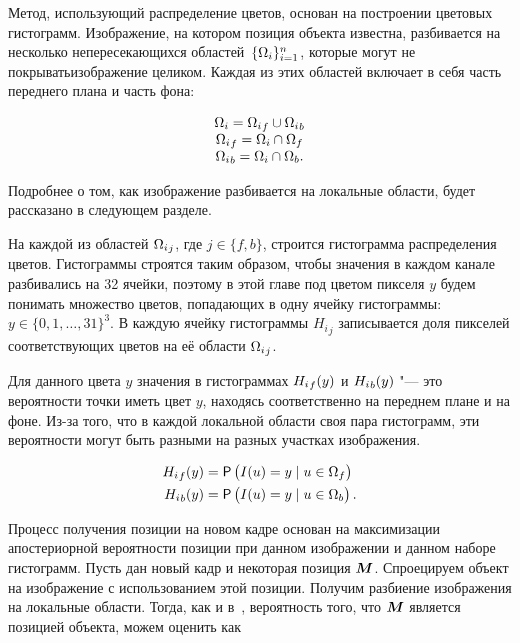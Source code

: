 Метод, использующий распределение цветов, основан на построении цветовых
гистограмм.
Изображение, на котором позиция объекта известна, разбивается на несколько
непересекающихся областей~$\{\Omega_i\}_{i = 1}^n$, которые могут не покрыватьизображение целиком.
Каждая из этих областей включает в себя часть переднего плана и часть фона:

\begin{equation}
\label{eqn:histo_partitioning}
\begin{array}{c}
\Omega_i = {\Omega_i}_f \cup {\Omega_i}_b \\
{\Omega_i}_f = \Omega_i \cap \Omega_f \\
{\Omega_i}_b = \Omega_i \cap \Omega_b
\text{.}
\end{array}
\end{equation}

Подробнее о том, как изображение разбивается на локальные области, будет
рассказано в следующем разделе.

На каждой из областей ${\Omega_i}_j$, где $j \in \{ f, b\}$, строится
гистограмма распределения цветов.
Гистограммы строятся таким образом, чтобы значения в каждом канале разбивались
на 32 ячейки, поэтому в этой главе под цветом пикселя $y$ будем понимать
множество цветов, попадающих в одну ячейку гистограммы:
$y \in \{0, 1, \dots, 31\}^3$.
В каждую ячейку гистограммы ${H_i}_j$ записывается доля пикселей
соответствующих
цветов на её области ${\Omega_i}_j$.

Для данного цвета $y$ значения в гистограммах ${H_i}_f(y)$ и
${H_i}_b(y)$ "--- это вероятности точки иметь цвет $y$, находясь
соответственно на переднем плане и на фоне.
Из-за того, что в каждой локальной области своя пара гистограмм, эти
вероятности могут быть разными на разных участках изображения.

\begin{align}
\label{eqn:H_f_Y}
    {\ensuremath{H_i}}_f(y) &= \mathsf{P} \left( I(\mathnormal{u}) = y \mid \mathnormal{u} \in \Omega_f \right) \\
    {H_i}_b(y) &= \mathsf{P} \left( I(\mathnormal{u}) = y \mid \mathnormal{u} \in \Omega_b \right)
\text{.}
\end{align}

Процесс получения позиции на новом кадре основан на максимизации апостериорной
вероятности позиции при данном изображении и данном наборе гистограмм.
Пусть дан новый кадр и некоторая позиция $\bm{M}$.
Спроецируем объект на изображение с использованием этой позиции.
Получим разбиение изображения на локальные области.
Тогда, как и в~\cite{Hexner2016}, вероятность того, что $\bm{M}$ является
позицией
объекта, можем оценить как

